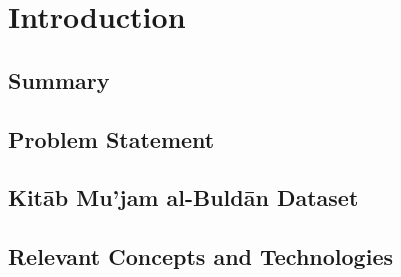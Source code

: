 \chapter{Introduction}\label{ch:introduction}

\section{Summary}\label{sec:summary}


\section{Problem Statement}\label{sec:problem-statement}


\section{Kitāb Mu'jam al-Buldān Dataset}\label{sec:yagut}


\section{Relevant Concepts and Technologies}\label{sec:relevant-concepts}


